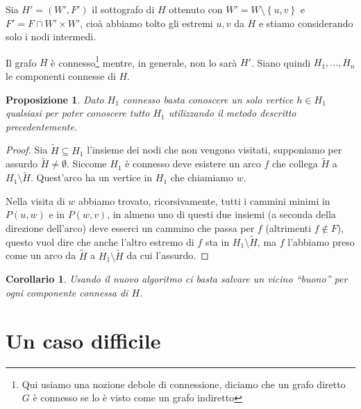 \documentclass[a4paper,10pt]{amsbook}
\newcounter{counter1}
\theoremstyle{plain}
\newtheorem{mypro}[counter1]{Proposizione}
\newtheorem{mycor}[counter1]{Corollario}
\theoremstyle{definition}
\theoremstyle{remark}
\newcommand{\set}[1]{\left\{#1\right\}}
\begin{document}
Sia $H' = (W',F')$ il sottografo di $H$ ottenuto con $W' = W \setminus
\set{u,v}$ e $F' = F \cap W' \times W'$, cio\`a abbiamo tolto gli
estremi $u,v$ da $H$ e stiamo considerando solo i nodi intermedi.

Il grafo $H$ \`e connesso\footnote{Qui usiamo una nozione debole di
  connessione, diciamo che un grafo diretto $G$ \`e connesso se lo \`e
  visto come un grafo indiretto} mentre, in generale, non lo sar\`a
$H'$. Siano quindi $H_1, ..., H_n$ le componenti connesse di $H$.

\begin{mypro}
  Dato $H_1$ connesso basta conoscere un solo vertice $h \in H_1$
  qualsiasi per poter conoscere tutto $H_1$ utilizzando il metodo
  descritto precedentemente.
\end{mypro}
\begin{proof}
  Sia $\tilde H \subseteq H_1$ l'insieme dei nodi che non vengono
  visitati, supponiamo per assurdo $\tilde H \neq \emptyset$. Siccome
  $H_1$ \`e connesso deve esistere un arco $f$ che collega $\tilde H$
  a $H_1 \setminus \tilde H$. Quest'arco ha un vertice in $H_1$ che
  chiamiamo $w$.

  Nella visita di $w$ abbiamo trovato, ricorsivamente, tutti i cammini
  minimi in $P(u,w)$ e in $P(w,v)$, in almeno uno di questi due
  insiemi (a seconda della direzione dell'arco) deve esserci un
  cammino che passa per $f$ (altrimenti $f\not\in F$), questo vuol
  dire che anche l'altro estremo di $f$ sta in $H_1 \setminus \tilde
  H$, ma $f$ l'abbiamo preso come un arco da $\tilde H$ a $H_1
  \setminus \tilde H$ da cui l'assurdo.
\end{proof}
\begin{mycor}
  Usando il nuovo algoritmo ci basta salvare un vicino ``buono'' per
  ogni componente connessa di $H$.
\end{mycor}



\section{Un caso difficile}
\label{sec:casodifficile}




\end{document}
